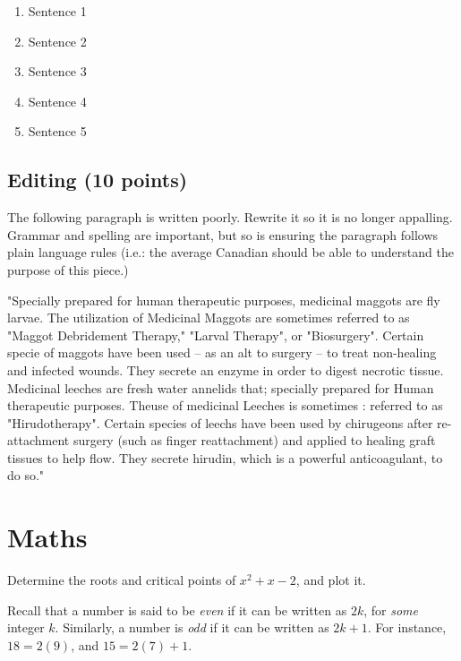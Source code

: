 \documentclass[11pt]{exam}
\begin{document}
\begin{questions}
\begin{enumerate}
\begin{enumerate}
\item Sentence 1
\item Sentence 2
\item Sentence 3
\item Sentence 4
\item Sentence 5
\end{enumerate}

\end{enumerate}

\newpage
\subsection{Editing (10 points)}
\setcounter{question}{0}
\question The following paragraph is written poorly. Rewrite it so it is no longer appalling. Grammar and spelling are important, but so is ensuring the paragraph follows plain language rules (i.e.: the average Canadian should be able to understand the purpose of this piece.)

\vspace{1cm}

"Specially prepared for human therapeutic purposes, medicinal maggots are fly larvae. The utilization of Medicinal Maggots are sometimes referred to as "Maggot Debridement Therapy," "Larval Therapy", or "Biosurgery". Certain specie of maggots have been used -- as an alt to surgery -- to treat non-healing and infected wounds. They secrete an enzyme in order to digest necrotic tissue. Medicinal leeches are fresh water annelids that; specially prepared for Human therapeutic purposes. Theuse of medicinal Leeches is sometimes : referred to as "Hirudotherapy".  Certain species of leechs have been used by chirugeons after re-attachment surgery (such as finger reattachment) and applied to healing graft tissues to help flow. They secrete hirudin, which is a powerful anticoagulant, to do so."

\vfill

\newpage
\section{Maths}
\setcounter{question}{0}

\question[6] Determine the roots and critical points of $x^2 + x - 2$, and plot
it.
\vfill




\newpage
\question Recall that a number is said to be \emph{even} if it can be written
as $2k$, for \emph{some} integer $k$. Similarly, a number is \emph{odd} if it
can be written as $2k + 1$. For instance, $18 = 2(9)$, and $15 = 2(7) + 1$.


\end{questions}
\end{document}
